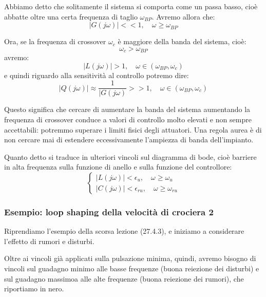 \documentclass[a4paper,11pt]{article}
\begin{document}
Abbiamo detto che solitamente il sistema si comporta come un passa basso, cioè abbatte oltre una certa frequenza di taglio $\omega_{BP}$.
Avremo allora che:
$$
|G(j\omega)| << 1, \quad \omega \geq \omega_{BP}
$$

Ora, se la frequenza di crossover $\omega_c$ è maggiore della banda del sistema, cioè:
$$
\omega_c > \omega_{BP}
$$
avremo:
$$
|L(j\omega)| > 1, \quad \omega \in (\omega_{BP}, \omega_c)
$$
e quindi riguardo alla sensitività al controllo potremo dire:
$$
|Q(j\omega)| \approx \frac{1}{|G(j\omega)} >> 1, \quad \omega \in (\omega_{BP}, \omega_c)
$$

Questo significa che cercare di aumentare la banda del sistema aumentando la frequenza di crossover conduce a valori di controllo molto elevati e non sempre accettabili: potremmo superare i limiti fisici degli attuatori.
Una regola aurea è di non cercare mai di estendere eccessivamente l'ampiezza di banda dell'impianto.

Quanto detto si traduce in ulteriori vincoli sul diagramma di bode, cioè barriere in alta frequenza sulla funzione di anello e sulla funzione del controllore:
\[
	\begin{cases}
		|L(j\omega)| < \epsilon_u, \quad \omega \geq \omega_u \\
		|C(j\omega)| < \epsilon_{ru}, \quad \omega \geq \omega_{ru}
	\end{cases}
\]

\subsubsection{Esempio: loop shaping della velocità di crociera 2}
Riprendiamo l'esempio della scorsa lezione (27.4.3), e iniziamo a considerare l'effetto di rumori e disturbi.

Oltre ai vincoli già applicati sulla pulsazione minima, quindi, avremo bisogno di vincoli sul guadagno minimo alle basse frequenze (buona reiezione dei disturbi) e sul guadagno massimoa alle alte frequenze (buona reiezione dei rumori), che riportiamo in nero.
\end{document}

